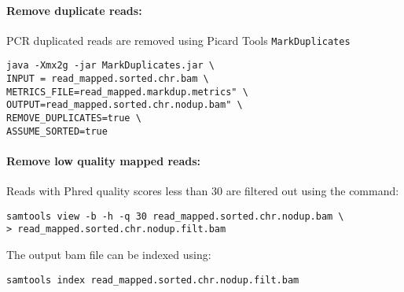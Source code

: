 \documentclass[10pt]{article}
\newcommand{\prog}[1]{\texttt{#1}}
\begin{document}
\paragraph{Remove duplicate reads:} PCR duplicated reads are removed using Picard Tools \prog{MarkDuplicates}
\begin{verbatim}
java -Xmx2g -jar MarkDuplicates.jar \
INPUT = read_mapped.sorted.chr.bam \
METRICS_FILE=read_mapped.markdup.metrics" \
OUTPUT=read_mapped.sorted.chr.nodup.bam" \
REMOVE_DUPLICATES=true \
ASSUME_SORTED=true
\end{verbatim}
\paragraph{Remove low quality mapped reads:} Reads with Phred quality scores less than 30 are filtered out using the command:
\begin{verbatim}
samtools view -b -h -q 30 read_mapped.sorted.chr.nodup.bam \
> read_mapped.sorted.chr.nodup.filt.bam
\end{verbatim}
The output bam file can be indexed using:
\begin{verbatim}
samtools index read_mapped.sorted.chr.nodup.filt.bam
\end{verbatim} 
\end{document}
